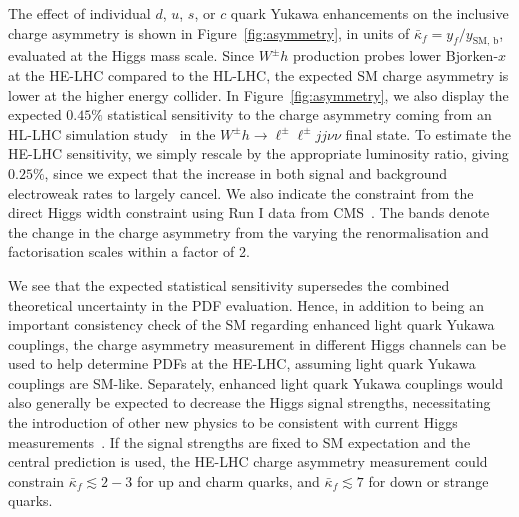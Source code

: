 \documentclass[../report.tex]{subfiles}
\begin{document}
The effect of individual $d$, $u$, $s$, or $c$ quark Yukawa
enhancements on the inclusive charge asymmetry is shown in
Figure~\ref{fig:asymmetry}, in units of $\bar{\kappa}_f = y_f /
y_{\text{SM, b}}$, evaluated at the Higgs mass scale.  Since $W^\pm h$
production probes lower Bjorken-$x$ at the HE-LHC compared to the
HL-LHC, the expected SM charge asymmetry is lower at the higher energy
collider.  In Figure~\ref{fig:asymmetry}, we also display the expected
$0.45\%$ statistical sensitivity to the charge asymmetry coming from
an HL-LHC simulation study~\cite{Yu:2016rvv} in the $W^\pm h \to
\ell^\pm \ell^\pm jj \nu \nu$ final state.  To estimate the HE-LHC
sensitivity, we simply rescale by the appropriate luminosity ratio,
giving $0.25\%$, since we expect that the increase in both signal and
background electroweak rates to largely cancel.  We also indicate the
constraint from the direct Higgs width constraint using Run I data
from CMS~\cite{Yu:2016rvv}.  The bands denote the change in the charge
asymmetry from the varying the renormalisation  and factorisation
scales within a factor of 2.

We see that the expected statistical sensitivity supersedes the
combined theoretical uncertainty in the PDF evaluation.  Hence, in
addition to being an important consistency check of the SM regarding
enhanced light quark Yukawa couplings, the charge asymmetry
measurement in different Higgs channels can be used to help determine
PDFs at the HE-LHC, assuming light quark Yukawa couplings are SM-like.
Separately, enhanced light quark Yukawa couplings would also generally
be expected to decrease the Higgs signal strengths, necessitating the
introduction of other new physics to be consistent with current Higgs
measurements~\cite{Yu:2016rvv}.  If the signal strengths are fixed to
SM expectation and the central prediction is used, the HE-LHC charge
asymmetry measurement could constrain $\bar{\kappa}_f \lesssim 2-3$
for up and charm quarks, and $\bar{\kappa}_f \lesssim 7$ for down or
strange quarks.






\end{document}
